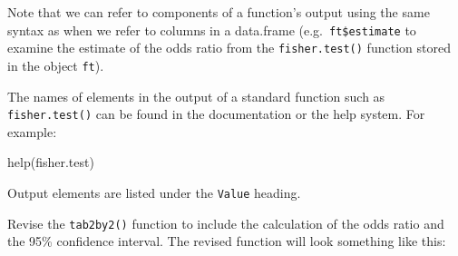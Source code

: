 \documentclass[
  12pt,
]{book}
\newenvironment{Shaded}{\begin{snugshade}}{\end{snugshade}}
\newcommand{\FunctionTok}[1]{\textcolor[rgb]{0.00,0.00,0.00}{#1}}
\newcommand{\NormalTok}[1]{#1}
\begin{document}
Note that we can refer to components of a function's output using the same syntax as when we refer to columns in a data.frame (e.g.~\texttt{ft\$estimate} to examine the estimate of the odds ratio from the \texttt{fisher.test()} function stored in the object \texttt{ft}).

The names of elements in the output of a standard function such as \texttt{fisher.test()} can be found in the documentation or the help system. For example:

\begin{Shaded}
\begin{Highlighting}[]
\FunctionTok{help}\NormalTok{(fisher.test)}
\end{Highlighting}
\end{Shaded}

\newpage

Output elements are listed under the \texttt{Value} heading.

Revise the \texttt{tab2by2()} function to include the calculation of the odds ratio and the 95\% confidence interval. The revised function will look something like this:
\end{document}
